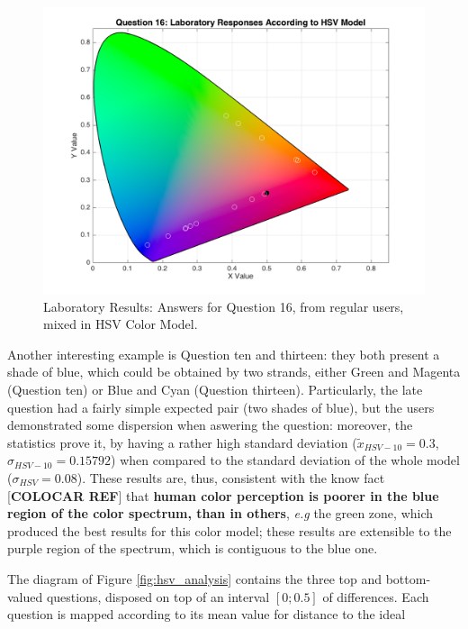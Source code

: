 \begin{enumerate}
\begin{figure}[!htbp]
\begin{minipage}{0.48\textwidth}
      \includegraphics[width=\textwidth]{images/16_lab_HSVresponses.png}
      \caption[Laboratory Results: Answers for Question 16, from regular users, mixed in HSV Color Model.]{Laboratory Results: Answers for Question 16, from regular users, mixed in HSV Color Model.}
      \label{fig:labhsvregular_16}
    \end{minipage}
  \end{figure}
\end{enumerate} \par
%
Another interesting example is Question ten and thirteen: they both present a shade of blue, which could be obtained by two strands, either Green and Magenta (Question ten) or Blue and Cyan (Question thirteen). Particularly, the
late question had a fairly simple expected pair (two shades of blue), but the users demonstrated some dispersion when aswering the question: moreover, the statistics prove it, by having a rather high standard deviation
($\tilde{x}_{HSV-10} = 0.3$, $\sigma_{HSV-10} = 0.15792$) when compared to the standard deviation of the whole model ($\sigma_{HSV} = 0.08$). These results are, thus, consistent with the know fact [\textbf{COLOCAR REF}] that
\textbf{human color perception is poorer in the blue region of the color spectrum, than in others}, \emph{e.g} the green zone, which produced the best results for this color model; these results are extensible to the purple region
of the spectrum, which is contiguous to the blue one. \par
%
The diagram of Figure \ref{fig:hsv_analysis} contains the three top and bottom-valued questions, disposed on top of an interval $[0 ; 0.5]$ of differences. Each question is mapped according to its mean value for distance to the ideal
